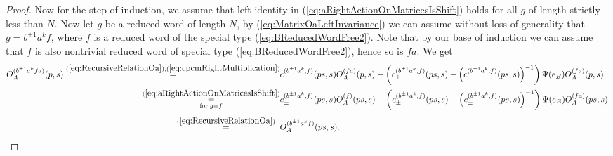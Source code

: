 \documentclass{amsart}
\begin{document}
\begin{proof}
Now for the step of induction, we assume that left identity in (\ref{eq:aRightActionOnMatricesIsShift}) holds for all $g$ of length strictly less than $N$. Now let $g$ be a reduced word of length $N$, by (\ref{eq:MatrixOaLeftInvariance}) we can assume without loss of generality that $g=b^{\pm1}a^kf$, where $f$ is a reduced word of the special type (\ref{eq:BReducedWordFree2}). Note that by our base of induction we can assume that $f$ is also nontrivial reduced word of special type (\ref{eq:BReducedWordFree2}), hence so is $fa$. We get
\begin{align*}
O_A^{(b^{\pm1}a^kfa)}(p,s)%
\overset{(\ref{eq:RecursiveRelationOa}),(\ref{eq:cpcmRightMultiplication})}{=}&c_{\pm}^{(b^{\pm1}a^k,f)}(ps,s)O_A^{(fa)}(p,s)-\left(c_{\pm}^{(b^{\pm1}a^k,f)}(ps,s)-\left(c_{\pm}^{(b^{\pm1}a^k,f)}(ps,s)\right)^{-1}\right)\Psi(e_B)O_A^{(fa)}(p,s)\\
\overset{(\ref{eq:aRightActionOnMatricesIsShift})}{\underset{\textrm{for}\;g=f}{=}}&c_{\pm}^{(b^{\pm1}a^k,f)}(ps,s)O_A^{(f)}(ps,s)-\left(c_{\pm}^{(b^{\pm1}a^k,f)}(ps,s)-\left(c_{\pm}^{(b^{\pm1}a^k,f)}(ps,s)\right)^{-1}\right)\Psi(e_B)O_A^{(fa)}(ps,s)\\[0.3em]
\overset{(\ref{eq:RecursiveRelationOa})}{=}\;\;&O_A^{(b^{\pm1}a^kf)}(ps,s).
\end{align*}


\end{proof}
\end{document}
